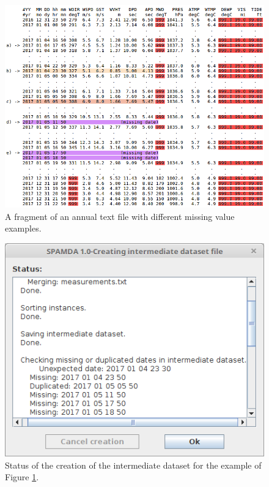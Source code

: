 \documentclass[energies,article,accept,moreauthors,pdftex]{Definitions/mdpi}
\begin{document}
\begin{figure}[H]
	\widefigure
			\includegraphics[scale=0.55]{figures/FigureMeasurements.png}
			\caption{A fragment of an annual text file with different missing value examples.}
			\label{fig:measurements}
		\end{figure}	
\begin{paracol}{2}
\switchcolumn
		\vspace{-6pt}
		
		\begin{figure}[H]
			\includegraphics[scale=0.6]{figures/FigureCreatingDataset.png}
			\caption{Status of the creation of the intermediate dataset for the example of Figure \ref{fig:measurements}.}
			\label{fig:creatingDataset}
		\end{figure}
		\vspace{-6pt}
		
		
\clearpage
\end{paracol}
\end{document}

